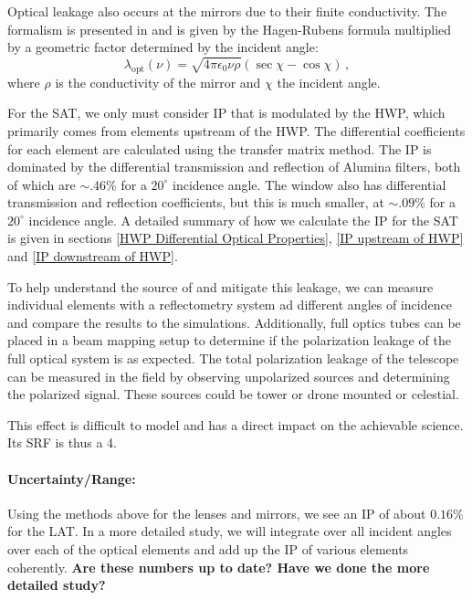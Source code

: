 Optical leakage also occurs at the mirrors due to their finite conductivity. 
The formalism is presented in \cite{Barkats:2005sh} and is given by the Hagen-Rubens formula multiplied by 
a geometric factor determined by the incident angle:
\begin{equation}
\lambda_\text{opt}(\nu) = \sqrt{4 \pi \epsilon_0 \nu \rho} (\sec \chi - \cos \chi) \, ,
\end{equation}
where $\rho$ is the conductivity of the mirror and $\chi$ the incident angle.


For the SAT, we only must consider IP that is modulated by the HWP, which primarily comes from elements upstream of the HWP.
The differential coefficients for each element are calculated using the transfer matrix method.
The IP is dominated by the differential transmission and reflection of Alumina filters, both of which are $\sim.46\%$ for a $20^\circ$ incidence angle. 
The window also has differential transmission and reflection coefficients, but this is much smaller,
at $\sim.09\%$ for a $20^\circ$ incidence angle.
A detailed summary of how we calculate the IP for the SAT is given in sections \ref{HWP Differential Optical Properties},
\ref{IP upstream of HWP} and \ref{IP downstream of HWP}. 

To help understand the source of and mitigate this leakage, we can measure individual elements with a reflectometry system ad different angles of incidence and compare the results to the simulations. Additionally, full optics tubes can be placed in a beam mapping setup to determine if the polarization leakage of the full optical system is as expected. The total polarization leakage of the telescope can be measured in the field by observing unpolarized sources and determining the polarized signal. These sources could be tower or drone mounted or celestial.

This effect is difficult to model and has a direct impact on the achievable science. Its SRF is thus a 4.

\paragraph{Uncertainty/Range:}
Using the methods above for the lenses and mirrors, we see an IP of about $0.16\%$ for the LAT.
In a more detailed study, we will integrate over all incident angles over each of the optical elements and add up the IP of various elements coherently. \textbf{Are these numbers up to date? Have we done the more detailed study?}

